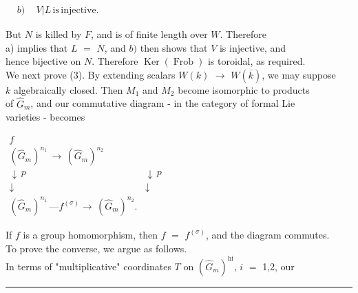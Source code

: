 \documentclass[9pt]{article}
\newcommand{\CanonText}[1]{\par{\fontsize{8.0}{9.35}\selectfont\RaggedRight #1\par}\vspace{2.2pt}}
\newenvironment{CanonMathBlock}{\par\vspace{1.2pt}\begin{center}\fontsize{6.8}{8.0}\selectfont\(\displaystyle}{\)\end{center}\vspace{1.2pt}}
\begin{document}
\begin{minipage}[t][\dimexpr\textheight-5pt\relax][t]{\textwidth}
\begin{CanonMathBlock}
\begin{aligned}
& b)\quad\,V|L\,\text{is}\,\text{injective}.
\end{aligned}
\end{CanonMathBlock}
\CanonText{But \(N\) is killed by \(F\), and is of finite length over \(W\). Therefore\\a) implies that \(L\) \(=\) \(N\), and \(b)\) then shows that \(V\) is injective, and\\hence bijective on \(N\). Therefore \(\operatorname{Ker}(\operatorname{Frob})\) is toroidal, as required.\\We next prove (3). By extending scalars \(W(k)\) \(\to{}\) \(W(\overline{k})\), we may suppose\\\(k\) algebraically closed. Then \(M_{1}\) and \(M_{2}\) become isomorphic to products\\of \(\widehat{G}_{m}\), and our commutative diagram - in the category of formal Lie\\varieties - becomes}
\begin{CanonMathBlock}
\begin{array}{cc}
f & {}\\
(\widehat{G}_{m})^{n_{1}}\,\longrightarrow{}\,(\widehat{G}_{m})^{n_{2}} & {}\\
\downarrow{}\,p & \downarrow{}\,p\\
\downarrow{} & \downarrow{}\\
(\widehat{G}_{m})^{n_{1}}\,\text{---}f^{(\sigma{})}\longrightarrow{}\,(\widehat{G}_{m})^{n_{2}}. & {}
\end{array}
\end{CanonMathBlock}
\CanonText{If \(f\) is a group homomorphism, then \(f\) \(=\) \(f^{(\sigma{})}\), and the diagram commutes.\\To prove the converse, we argue as follows.\\In terms of "multiplicative" coordinates \(T\) on \((\widehat{G}_{m})^{\mathrm{hi}}\), \(i\) \(=\) 1,2, our}
\vfill
{\color{Accent}\hrule height 0.35pt}\vspace{3pt}
\end{minipage}
\newpage
\end{document}
